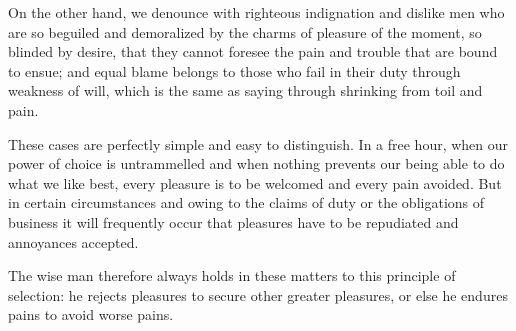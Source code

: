 On the other hand, we denounce with righteous indignation and dislike men who are so beguiled and demoralized by the charms of pleasure of the moment, so blinded by desire, that they cannot foresee the pain and trouble that are bound to ensue; and equal blame belongs to those who fail in their duty through weakness of will, which is the same as saying through shrinking from toil and pain.

These cases are perfectly simple and easy to distinguish. In a free hour, when our power of choice is untrammelled and when nothing prevents our being able to do what we like best, every pleasure is to be welcomed and every pain avoided. But in certain circumstances and owing to the claims of duty or the obligations of business it will frequently occur that pleasures have to be repudiated and annoyances accepted. 

The wise man therefore always holds in these matters to this principle of selection: he rejects pleasures to secure other greater pleasures, or else he endures pains to avoid worse pains.
\vfill
\stopcanonpage

\vfil\eject



